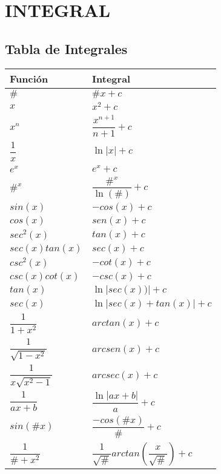 \section{INTEGRAL}


\subsection{Tabla de Integrales}
\begin{tabular}{ll}
	\hline \hline
	Función & Integral\\
	\hline
	$\#$ & $\#x+c$\\
	$x$ & $x^2+c$\\
	$x^n$ & $\dfrac{x^{n+1}}{n+1}+c$\\
	$\dfrac{1}{x}$ & $\ln|x|+c$\\
	$e^x$ & $e^x+c$\\
	$\#^x$ & $\dfrac{\#^x}{\ln(\#)}+c$\\
	$sin(x)$ & $-cos(x)+c$\\
	$cos(x)$ & $sen(x)+c$\\
	$sec^2(x)$ & $tan(x)+c$\\
	$sec(x)tan(x)$ & $sec(x)+c$\\
	$csc^2(x)$ & $-cot(x)+c$\\
	$csc(x)cot(x)$ & $-csc(x)+c$\\
	$tan(x)$ & $\ln|sec(x))|+c$\\
	$sec(x)$ & $\ln|sec(x)+tan(x)|+c$\\
	$\dfrac{1}{1+x^2}$ & $arctan(x)+c$\\
	$\dfrac{1}{\sqrt{1-x^2}}$ & $arcsen(x)+c$\\
	$\dfrac{1}{x\sqrt{x^2-1}}$ & $arcsec(x)+c$\\
	$\dfrac{1}{ax+b}$ & $\dfrac{\ln|ax+b|}{a}+c$\\
	$sin(\#x)$ & $\dfrac{-cos(\#x)}{\#}+c$\\
	$\dfrac{1}{\#+x^2}$ & $\dfrac{1}{\sqrt{\#}}arctan\left( \dfrac{x}{\sqrt{\#}}\right) +c$\\
	\hline
\end{tabular}\\

